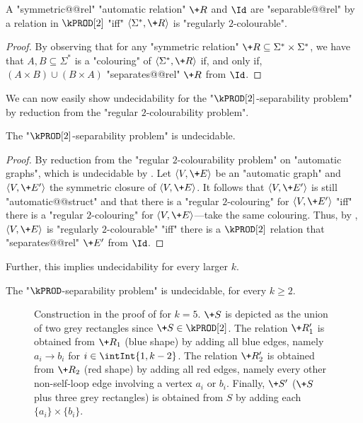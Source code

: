 \begin{corollary}\AP\label{cor:2reg-2prod}
    A "symmetric@@rel" "automatic relation" $\+R$ and $\Id$ are "separable@@rel" by a relation in $\kPROD[2]$ "iff" $\tup{\Sigma^*,\+R}$ is "regularly $2$-colourable".
\end{corollary}

\begin{proof}
    By observing that for any "symmetric relation" $\+R \subseteq \Sigma^* \times \Sigma^*$, we have that $A,B \subseteq \Sigma^*$ is a "colouring" of $\tup{\Sigma^*,\+R}$ if, and only if, $(A \times B) \cup (B \times A)$ "separates@@rel" $\+R$ from $\Id$.
\end{proof}

We can now easily show undecidability for the "$\kPROD[2]$-separability problem" by reduction from the "regular $2$-colourability problem".
\begin{lemma}\AP\label{lem:aut-2prod-sep-undec}
    The "$\kPROD[2]$-separability problem" is undecidable.
\end{lemma}
\begin{proof}
    By reduction from the "regular $2$-colourability problem" on "automatic graphs", which is undecidable by . Let $\tup{V,\+E}$ be an "automatic graph" and $\tup{V,\+E'}$ the symmetric closure of $\tup{V,\+E}$. It follows that $\tup{V,\+E'}$ is still "automatic@@struct" and that there is a "regular $2$-colouring" for $\tup{V,\+E'}$ "iff" there is a "regular $2$-colouring" for $\tup{V,\+E}$---take the same colouring.
    Thus, by , $\tup{V,\+E}$ is "regularly $2$-colourable" "iff" 
    there is a $\kPROD[2]$ relation that "separates@@rel" $\+E'$ from $\Id$.
\end{proof}

Further, this implies undecidability for every larger $k$.
\begin{proposition}
    \AP\label{prop:kprod-undecidable}
    The "$\kPROD$-separability problem" is undecidable, for every $k \geq 2$.
\end{proposition}

\begin{figure}
    \centering
    \begin{tikzpicture}
        
    \end{tikzpicture}
    \caption{
        \AP\label{fig:2prod-to-kprod}
        Construction in the proof of  for $k = 5$. $\+S$ is depicted as the union of two grey rectangles since $\+S \in \kPROD[2]$.
        The relation $\+R'_1$ is obtained from $\+R_1$ (blue shape) by adding all blue edges,
        namely $a_i \to b_i$ for $i \in \intInt{1,k-2}$. The relation $\+R'_2$ is obtained from $\+R_2$ (red shape) by adding
        all red edges, namely every other non-self-loop edge involving a vertex $a_i$ or $b_i$.
        Finally, $\+S'$ ($\+S$ plus three grey rectangles) is obtained from $S$ by adding
        each $\{a_i\} \times \{b_i\}$.
    }
\end{figure}

